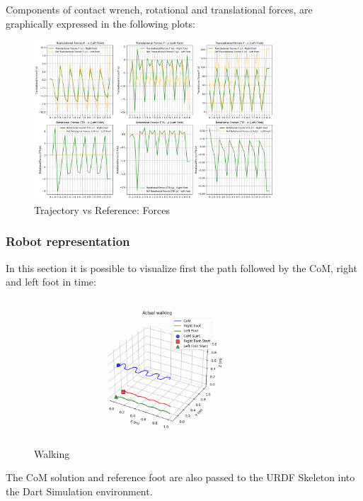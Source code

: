 \documentclass[main.tex]{subfiles}
\begin{document}
Components of contact wrench, rotational and translational forces, are graphically expressed in the following plots:
\begin{figure}[htbp]
    \centering
    \includegraphics[width=0.8\textwidth]{figures/contact_forces_walking.png}
    \caption{Trajectory vs Reference: Forces}
    \label{fig:contact_forces_walking}
\end{figure}

\newpage
\subsubsection{Robot representation}
In this section it is possible to visualize first the path followed by the CoM, right and left foot in time:
\begin{figure}[htbp]
    \centering
    \includegraphics[width=0.8\textwidth]{figures/walking.PNG}
    \caption{Walking}
    \label{fig:walking}
\end{figure}

The CoM solution and reference foot are also passed to the URDF Skeleton into the Dart Simulation environment. 

\centering
{}
 
\end{document}
